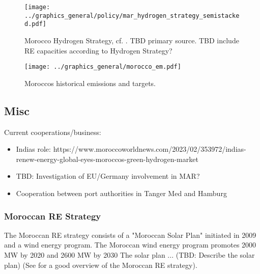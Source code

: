 \begin{figure}
    \centering
    \texttt{[image: ../graphics\_general/policy/mar\_hydrogen\_strategy\_semistacked.pdf]}
    \caption{Morocco Hydrogen Strategy, cf. \cite[p. 14]{Ersoy2022}. TBD primary source. TBD include RE capacities according to Hydrogen Strategy?}
    \label{fig:mar_hydrogen_strategy}
\end{figure}




\begin{figure}[h!]
    \centering
    \texttt{[image: ../graphics\_general/morocco\_em.pdf]}
    \caption{Moroccos historical emissions and targets.}
    \label{fig:morocco_em}
\end{figure}


\subsection{Misc}

Current cooperations/business:
\begin{itemize}
    \item Indias role: https://www.moroccoworldnews.com/2023/02/353972/indias-renew-energy-global-eyes-moroccos-green-hydrogen-market
    \item TBD: Investigation of EU/Germany involvement in MAR?
    \item Cooperation between port authorities in Tanger Med and Hamburg
\end{itemize}

\subsubsection{Moroccan RE Strategy}
The Moroccan RE strategy consists of a "Moroccan Solar Plan" initiated in 2009 \cite[p. 2]{Boulakhbar2020}
and a wind energy program.
The Moroccan wind energy program promotes 2000 MW by 2020 and 2600 MW by 2030 \cite[p. 4]{Boulakhbar2020}
The solar plan ... (TBD: Describe the solar plan)
(See \cite[p. 13]{Ersoy2022} for a good overview of the Moroccan RE strategy).